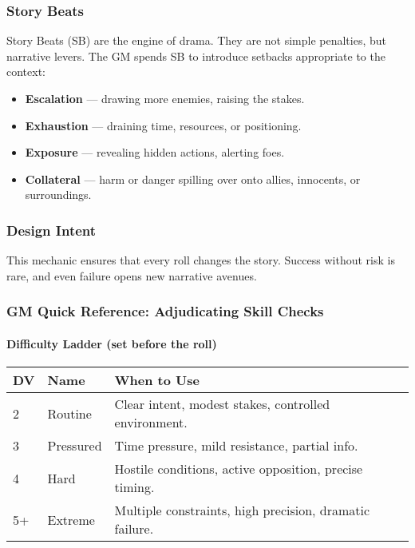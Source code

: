 \subsubsection{Story Beats}
Story Beats (SB) are the engine of drama. They are not simple penalties, but narrative levers. The GM spends SB to introduce setbacks appropriate to the context:
\begin{itemize}
  \item \textbf{Escalation} — drawing more enemies, raising the stakes.
  \item \textbf{Exhaustion} — draining time, resources, or positioning.
  \item \textbf{Exposure} — revealing hidden actions, alerting foes.
  \item \textbf{Collateral} — harm or danger spilling over onto allies, innocents, or surroundings.
\end{itemize}

\subsubsection{Design Intent}
This mechanic ensures that every roll changes the story. Success without risk is rare, and even failure opens new narrative avenues.

\subsubsection{GM Quick Reference: Adjudicating Skill Checks}

\paragraph{Difficulty Ladder (set before the roll)}
\begin{center}
\begin{tabular}{@{}lll@{}}
\toprule
\textbf{DV} & \textbf{Name} & \textbf{When to Use} \\
\midrule
2 & Routine   & Clear intent, modest stakes, controlled environment. \\
3 & Pressured & Time pressure, mild resistance, partial info. \\
4 & Hard      & Hostile conditions, active opposition, precise timing. \\
5+& Extreme   & Multiple constraints, high precision, dramatic failure. \\
\bottomrule
\end{tabular}
\end{center}


